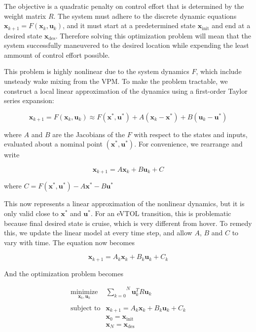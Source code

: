 \documentclass[12pt, letterpaper]{article}
\begin{document}
The objective is a quadratic penalty on control effort that is determined by the weight matrix $R$.  The system must adhere to the discrete dynamic equations $\mathbf{x}_{k+1} = F(\mathbf{x}_k, \mathbf{u}_k)$, and it must start at a predetermined state $\mathbf{x}_{\text{init}}$ and end at a desired state $\mathbf{x}_{\text{des}}$.  Therefore solving this optimization problem will mean that the system successfully maneuvered to the desired location while expending the least ammount of control effort possible. 

This problem is highly nonlinear due to the system dynamics $F$, which include unsteady wake mixing from the VPM. To make the problem tractable, we construct a local linear approximation of the dynamics using a first-order Taylor series expansion:  

\begin{equation}
\label{eq:taylor_series}
    \mathbf{x}_{k+1} = F(\mathbf{x}_k,\mathbf{u}_k) \approx F(\mathbf{x}^*,\mathbf{u}^*) + A (\mathbf{x}_k - \mathbf{x}^*) + B (\mathbf{u}_k - \mathbf{u}^*)
\end{equation}

where $A$ and $B$ are the Jacobians of the $F$ with respect to the states and inputs, evaluated about a nominal point $(\mathbf{x}^*, \mathbf{u}^*)$.  For convenience, we rearrange and write


\begin{equation}
\label{eq:taylor_series}
    \mathbf{x}_{k+1} = A \mathbf{x}_k + B \mathbf{u}_k + C
\end{equation}

where $C = F(\mathbf{x}^*, \mathbf{u}^*) - A \mathbf{x}^* - B \mathbf{u}^*$

This now represents a linear approximation of the nonlinear dynamics, but it is only valid close to $\mathbf{x}^*$ and $\mathbf{u}^*$.  For an eVTOL transition, this is problematic because final desired state is cruise, which is very different from hover.  To remedy this, we update the linear model at every time step, and allow $A$, $B$ and $C$ to vary with time.  The equation now becomes


\begin{equation}
\label{eq:taylor_series}
    \mathbf{x}_{k+1} = A_k \mathbf{x}_k + B_k \mathbf{u}_k + C_k
\end{equation}

And the optimization problem becomes


\begin{equation}
    \label{eq:LQR}
    \begin{matrix}
        \underset{\mathbf{x}_k, \mathbf{u}_k}{\text{minimize}} & \overset{N}{\underset{k=0}{\sum}} \mathbf{u}_k^T R \mathbf{u}_k \\ \\ 
        \text{subject to} & \mathbf{x}_{k+1} = A_k \mathbf{x}_k + B_k \mathbf{u}_k + C_k\\
        & \mathbf{x}_0 = \mathbf{x}_{\text{init}} \\ 
        & \mathbf{x}_N = \mathbf{x}_{\text{des}}
    \end{matrix}
\end{equation}
\end{document}
